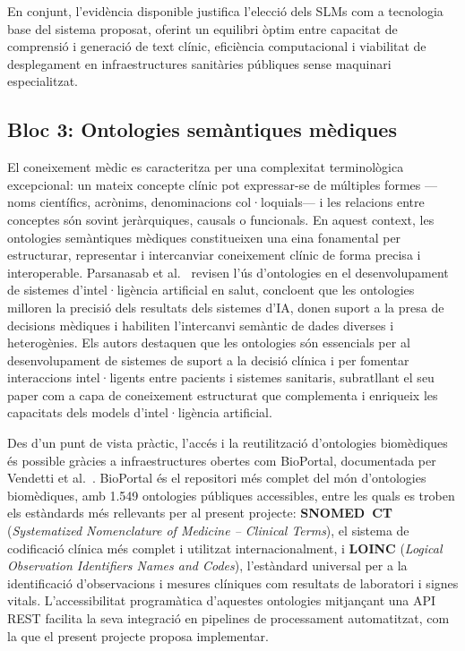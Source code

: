 \documentclass[11pt,a4paper]{article}
\begin{document}
En conjunt, l'evidència disponible justifica l'elecció dels SLMs com a tecnologia base del sistema proposat, oferint un equilibri òptim entre capacitat de comprensió i generació de text clínic, eficiència computacional i viabilitat de desplegament en infraestructures sanitàries públiques sense maquinari especialitzat.

\subsection*{Bloc 3: Ontologies semàntiques mèdiques}

El coneixement mèdic es caracteritza per una complexitat terminològica excepcional: un mateix concepte clínic pot expressar-se de múltiples formes ---noms científics, acrònims, denominacions col·loquials--- i les relacions entre conceptes són sovint jeràrquiques, causals o funcionals. En aquest context, les ontologies semàntiques mèdiques constitueixen una eina fonamental per estructurar, representar i intercanviar coneixement clínic de forma precisa i interoperable. Parsanasab et al.~\cite{parsanasab2025ontologies} revisen l'ús d'ontologies en el desenvolupament de sistemes d'intel·ligència artificial en salut, concloent que les ontologies milloren la precisió dels resultats dels sistemes d'IA, donen suport a la presa de decisions mèdiques i habiliten l'intercanvi semàntic de dades diverses i heterogènies. Els autors destaquen que les ontologies són essencials per al desenvolupament de sistemes de suport a la decisió clínica i per fomentar interaccions intel·ligents entre pacients i sistemes sanitaris, subratllant el seu paper com a capa de coneixement estructurat que complementa i enriqueix les capacitats dels models d'intel·ligència artificial.

Des d'un punt de vista pràctic, l'accés i la reutilització d'ontologies biomèdiques és possible gràcies a infraestructures obertes com BioPortal, documentada per Vendetti et al.~\cite{vendetti2025bioportal}. BioPortal és el repositori més complet del món d'ontologies biomèdiques, amb 1.549 ontologies públiques accessibles, entre les quals es troben els estàndards més rellevants per al present projecte: \textbf{SNOMED~CT} (\textit{Systematized Nomenclature of Medicine -- Clinical Terms}), el sistema de codificació clínica més complet i utilitzat internacionalment, i \textbf{LOINC} (\textit{Logical Observation Identifiers Names and Codes}), l'estàndard universal per a la identificació d'observacions i mesures clíniques com resultats de laboratori i signes vitals. L'accessibilitat programàtica d'aquestes ontologies mitjançant una API REST facilita la seva integració en pipelines de processament automatitzat, com la que el present projecte proposa implementar.
\end{document}
